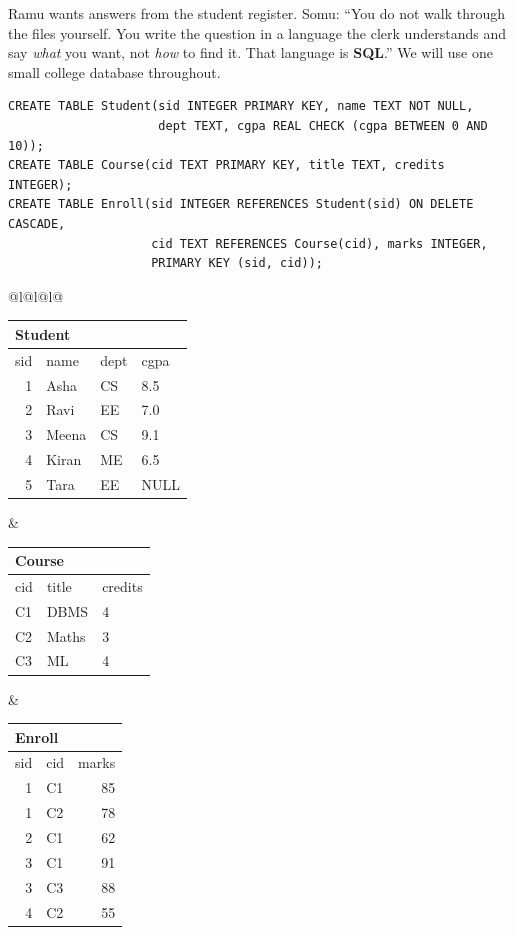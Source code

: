 \documentclass[11pt,a4paper]{article}
\begin{document}
\begin{story}
Ramu wants answers from the student register. Somu: ``You do not walk through the files yourself. You write the question in a language the clerk understands and say \emph{what} you want, not \emph{how} to find it. That language is \textbf{SQL}.'' We will use one small college database throughout.
\end{story}

\begin{lstlisting}[style=sql]
CREATE TABLE Student(sid INTEGER PRIMARY KEY, name TEXT NOT NULL,
                     dept TEXT, cgpa REAL CHECK (cgpa BETWEEN 0 AND 10));
CREATE TABLE Course(cid TEXT PRIMARY KEY, title TEXT, credits INTEGER);
CREATE TABLE Enroll(sid INTEGER REFERENCES Student(sid) ON DELETE CASCADE,
                    cid TEXT REFERENCES Course(cid), marks INTEGER,
                    PRIMARY KEY (sid, cid));
\end{lstlisting}
\begin{center}
\small
\begin{tabular}{@{}l@{\hspace{1.2cm}}l@{\hspace{1.2cm}}l@{}}
\begin{tabular}{rlll}
\multicolumn{4}{l}{\textbf{Student}}\\\toprule
sid&name&dept&cgpa\\\midrule
1&Asha&CS&8.5\\2&Ravi&EE&7.0\\3&Meena&CS&9.1\\4&Kiran&ME&6.5\\5&Tara&EE&NULL\\\bottomrule
\end{tabular}&
\begin{tabular}{lll}
\multicolumn{3}{l}{\textbf{Course}}\\\toprule
cid&title&credits\\\midrule
C1&DBMS&4\\C2&Maths&3\\C3&ML&4\\\bottomrule
\end{tabular}&
\begin{tabular}{rlr}
\multicolumn{3}{l}{\textbf{Enroll}}\\\toprule
sid&cid&marks\\\midrule
1&C1&85\\1&C2&78\\2&C1&62\\3&C1&91\\3&C3&88\\4&C2&55\\\bottomrule
\end{tabular}
\end{tabular}
\end{center}
\end{document}
